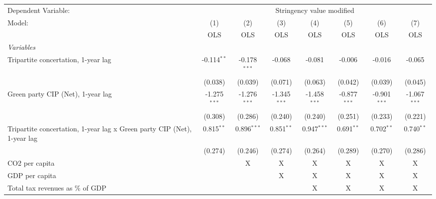 
\begingroup
\centering
\begin{tabular}{lccccccc}
   \toprule
   Dependent Variable: & \multicolumn{7}{c}{Stringency value modified}\\
   Model:                                                                  & (1)            & (2)            & (3)            & (4)            & (5)            & (6)            & (7)\\  
                                                                           &  OLS           & OLS            & OLS            & OLS            & OLS            & OLS            & OLS\\  
   \midrule
   \emph{Variables}\\
   Tripartite concertation, 1-year lag                                     & -0.114$^{**}$  & -0.178$^{***}$ & -0.068         & -0.081         & -0.006         & -0.016         & -0.065\\   
                                                                           & (0.038)        & (0.039)        & (0.071)        & (0.063)        & (0.042)        & (0.039)        & (0.045)\\   
   Green party CIP (Net), 1-year lag                                       & -1.275$^{***}$ & -1.276$^{***}$ & -1.345$^{***}$ & -1.458$^{***}$ & -0.877$^{***}$ & -0.901$^{***}$ & -1.067$^{***}$\\   
                                                                           & (0.308)        & (0.286)        & (0.240)        & (0.240)        & (0.251)        & (0.233)        & (0.221)\\   
   Tripartite concertation, 1-year lag x Green party CIP (Net), 1-year lag & 0.815$^{**}$   & 0.896$^{***}$  & 0.851$^{**}$   & 0.947$^{***}$  & 0.691$^{**}$   & 0.702$^{**}$   & 0.740$^{**}$\\   
                                                                           & (0.274)        & (0.246)        & (0.274)        & (0.264)        & (0.289)        & (0.270)        & (0.286)\\   
   CO2 per capita                                                          &                & X              & X              & X              & X              & X              & X\\  
   GDP per capita                                                          &                &                & X              & X              & X              & X              & X\\  
   Total tax revenues as \% of GDP                                         &                &                &                & X              & X              & X              & X\\  

\end{tabular}
